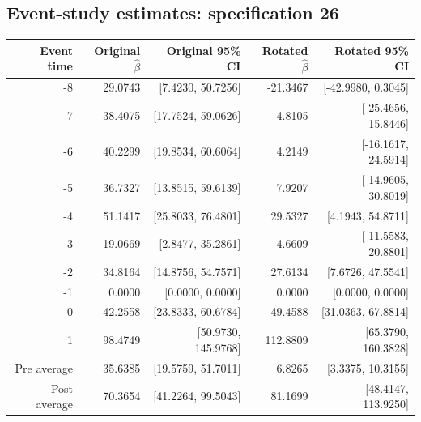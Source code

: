\documentclass[10pt]{article}
\begin{document}
\subsection*{Event-study estimates: specification 26}
\begin{center}\scriptsize
\begin{tabular}{r rr rr}
\toprule
Event time & Original $\hat\beta$ & Original 95\% CI & Rotated $\hat\beta$ & Rotated 95\% CI \\
\midrule
-8 & 29.0743 & [7.4230, 50.7256] & -21.3467 & [-42.9980, 0.3045] \\
-7 & 38.4075 & [17.7524, 59.0626] & -4.8105 & [-25.4656, 15.8446] \\
-6 & 40.2299 & [19.8534, 60.6064] & 4.2149 & [-16.1617, 24.5914] \\
-5 & 36.7327 & [13.8515, 59.6139] & 7.9207 & [-14.9605, 30.8019] \\
-4 & 51.1417 & [25.8033, 76.4801] & 29.5327 & [4.1943, 54.8711] \\
-3 & 19.0669 & [2.8477, 35.2861] & 4.6609 & [-11.5583, 20.8801] \\
-2 & 34.8164 & [14.8756, 54.7571] & 27.6134 & [7.6726, 47.5541] \\
-1 & 0.0000 & [0.0000, 0.0000] & 0.0000 & [0.0000, 0.0000] \\
0 & 42.2558 & [23.8333, 60.6784] & 49.4588 & [31.0363, 67.8814] \\
1 & 98.4749 & [50.9730, 145.9768] & 112.8809 & [65.3790, 160.3828] \\
\midrule
Pre average & 35.6385 & [19.5759, 51.7011] & 6.8265 & [3.3375, 10.3155] \\
Post average & 70.3654 & [41.2264, 99.5043] & 81.1699 & [48.4147, 113.9250] \\
\bottomrule
\end{tabular}
\end{center}
\clearpage
\end{document}
